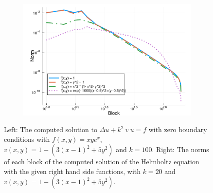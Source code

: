 \documentclass[11pt, oneside]{article}   	%
\begin{document}
\begin{figure}[t]
	\begin{subfigure}{0.5\textwidth}
	\includegraphics[scale=0.5]{solutionblocknorms-helmholtz-k=20}
	\centering
	\end{subfigure}
	\caption{Left: The computed solution to $\Delta u + k^2 \: v \: u = f$ with zero boundary conditions with $f(x,y) = xye^x$, $v(x,y) = 1 - (3(x-1)^2 + 5y^2)$ and $k = 100$. Right: The norms of each block of the computed solution of the Helmholtz equation with the given right hand side functions, with $k=20$ and $v(x,y) = 1 - (3(x-1)^2 + 5y^2)$.}
	\centering
	\label{fig:helmholtz}
\end{figure}
\end{document}
